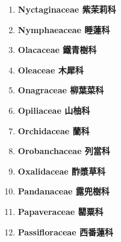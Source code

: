 \begin{enumerate}
        
      \item[] \begin{small}\textbf{Nyctaginaceae 紫茉莉科} \end{small}
        
      \item[] \begin{small}\textbf{Nymphaeaceae 睡蓮科} \end{small}
        
      \item[] \begin{small}\textbf{Olacaceae 鐵青樹科} \end{small}
        
      \item[] \begin{small}\textbf{Oleaceae 木犀科} \end{small}
        
      \item[] \begin{small}\textbf{Onagraceae 柳葉菜科} \end{small}
        
      \item[] \begin{small}\textbf{Opiliaceae 山柚科} \end{small}
        
      \item[] \begin{small}\textbf{Orchidaceae 蘭科} \end{small}
        
      \item[] \begin{small}\textbf{Orobanchaceae 列當科} \end{small}
        
      \item[] \begin{small}\textbf{Oxalidaceae 酢漿草科} \end{small}
        
      \item[] \begin{small}\textbf{Pandanaceae 露兜樹科} \end{small}
        
      \item[] \begin{small}\textbf{Papaveraceae 罌粟科} \end{small}
        
      \item[] \begin{small}\textbf{Passifloraceae 西番蓮科} \end{small}

\end{enumerate}
